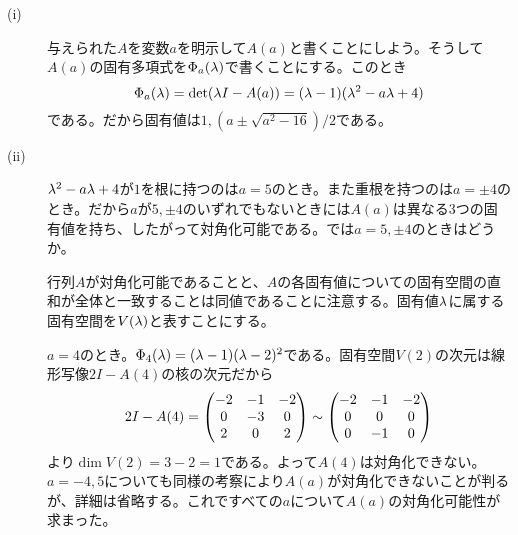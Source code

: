 \begin{sol} ${}$
  \begin{description}
\item[(i)] 与えられた$A$を変数$a$を明示して$A(a)$と書くことにしよう。そうして$A(a)$の固有多項式を$\Phi_a({\lambda})$で書くことにする。このとき
\[
\Phi_a({\lambda}) = \det({\lambda} I - A(a)) = ({\lambda} - 1)({\lambda}^2 - a {\lambda} + 4)
\]
である。だから固有値は$1, (a \pm \sqrt{a^2 - 16})/2$である。
\item[(ii)] ${\lambda}^2 - a {\lambda} + 4$が$1$を根に持つのは$a=5$のとき。また重根を持つのは$a=\pm 4$のとき。だから$a$が$5, \pm 4$のいずれでもないときには$A(a)$は異なる$3$つの固有値を持ち、したがって対角化可能である。では$a =5, \pm 4 $のときはどうか。

行列$A$が対角化可能であることと、$A$の各固有値についての固有空間の直和が全体と一致することは同値であることに注意する。固有値${\lambda}$に属する固有空間を$V({\lambda})$と表すことにする。

$a=4$のとき。$\Phi_4 ({\lambda})= ({\lambda}-1)({\lambda}-2)^2 $である。固有空間$V(2)$の次元は線形写像$2 I - A(4)$の核の次元だから
\[
2 I - A(4) = \begin{pmatrix} 
-2& -1& -2 \\
0 &-3& 0 \\
2 &0& 2
 \end{pmatrix}
\sim
\begin{pmatrix} 
-2 &-1& -2 \\
0 &0& 0 \\
0& -1& 0
 \end{pmatrix}
\]
より$\dim V(2) = 3 - 2 = 1$である。よって$A(4)$は対角化できない。$a=-4, 5$についても同様の考察により$A(a)$が対角化できないことが判るが、詳細は省略する。これですべての$a$について$A(a)$の対角化可能性が求まった。
  \end{description}
\end{sol}

\newpage

